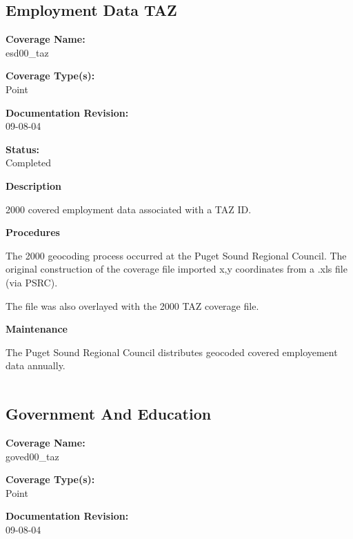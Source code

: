 \begin{landscape}
\begin{longtable}{llrrrrrc}

\end{longtable}
\end{landscape}
\newpage

\subsection{Employment Data TAZ}
{\bf \large Coverage Name:}\\
esd00\_taz

{\bf \large Coverage Type(s):}\\
Point

{\bf \large Documentation Revision:}\\
09-08-04

{\bf \large Status:}\\
Completed

{\bf \large Description}

2000 covered employment data associated with a TAZ ID.

{\bf \large Procedures}

The 2000 geocoding process occurred at the Puget Sound Regional
Council. The original construction of the coverage file imported
x,y coordinates from a .xls file (via PSRC).

The file was also overlayed with the 2000 TAZ coverage file.

{\bf \large Maintenance}

The Puget Sound Regional Council distributes geocoded covered
employement data annually.

\begin{landscape}
\begin{longtable}{llrrrrrc}

\end{longtable}
\end{landscape}
\newpage

\subsection{Government And Education}
{\bf \large Coverage Name:}\\
goved00\_taz

{\bf \large Coverage Type(s):}\\
Point

{\bf \large Documentation Revision:}\\
09-08-04

